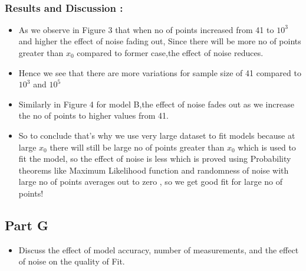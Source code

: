 \documentclass[a4paper,10pt]{article}
\providecommand{\tightlist}{%
      \setlength{\itemsep}{0pt}\setlength{\parskip}{0pt}}
\begin{document}
    \begin{center}
    \end{center}
    { \hspace*{\fill} \\}
    
    \subsubsection{Results and Discussion :}\label{results-and-discussion}

\begin{itemize}
\tightlist
\item
  As we observe in Figure 3 that when no of points increased from 41 to
  \(10^3\) and higher the effect of noise fading out, Since there will
  be more no of points greater than \(x_0\) compared to former case,the
  effect of noise reduces.
\item
  Hence we see that there are more variations for sample size of 41
  compared to \(10^3\) and \(10^5\)
\item
  Similarly in Figure 4 for model B,the effect of noise fades out as we
  increase the no of points to higher values from 41.
\item
  So to conclude that's why we use very large dataset to fit models
  because at large \(x_0\) there will still be large no of points
  greater than \(x_0\) which is used to fit the model, so the effect of
  noise is less which is proved using Probability theorems like Maximum
  Likelihood function and randomness of noise with large no of points
  averages out to zero , so we get good fit for large no of points!
\end{itemize}

    \subsection{Part G}\label{part-g}

\begin{itemize}
\tightlist
\item
  Discuss the effect of model accuracy, number of measurements, and the
  effect of noise on the quality of Fit.
\end{itemize}
\end{document}
